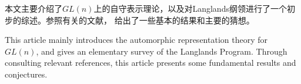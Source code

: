 
 

\makeatletter
\ifthu@bachelor\relax\else
  \ifthu@doctor
  \else
    \ifthu@master
    \fi
  \fi
\fi
\makeatother


 
 


\begin{cabstract}
  本文主要介绍了$GL(n)$上的自守表示理论，以及对Langlands纲领进行了一个初步的综述。参照有关的文献，
  给出了一些基本的结果和主要的猜想。
\end{cabstract}


\begin{eabstract}
   This article mainly introduces the automorphic representation
   theory for $GL(n)$, and gives an elementary survey of the
   Langlands Program. Through consulting relevant references, this
   article presents some fundamental results and conjectures.
\end{eabstract}

